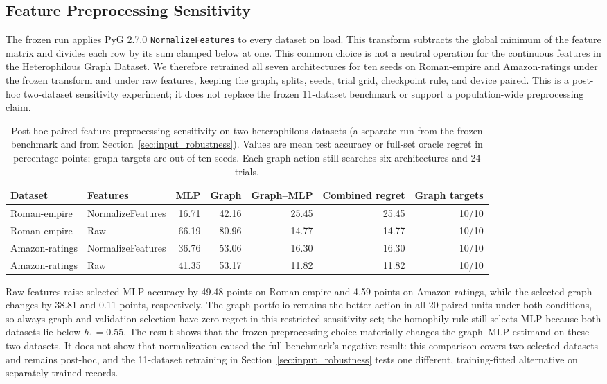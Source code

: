 \subsection{Feature Preprocessing Sensitivity}
\label{sec:preprocessing_sensitivity}

The frozen run applies PyG 2.7.0 \texttt{NormalizeFeatures} to every dataset on load. This transform subtracts the global minimum of the feature matrix and divides each row by its sum clamped below at one. This common choice is not a neutral operation for the continuous features in the Heterophilous Graph Dataset. We therefore retrained all seven architectures for ten seeds on Roman-empire and Amazon-ratings under the frozen transform and under raw features, keeping the graph, splits, seeds, trial grid, checkpoint rule, and device paired. This is a post-hoc two-dataset sensitivity experiment; it does not replace the frozen 11-dataset benchmark or support a population-wide preprocessing claim.

\begin{table}[t]
\centering
\caption{Post-hoc paired feature-preprocessing sensitivity on two heterophilous datasets (a separate run from the frozen benchmark and from Section~\ref{sec:input_robustness}). Values are mean test accuracy or full-set oracle regret in percentage points; graph targets are out of ten seeds. Each graph action still searches six architectures and 24 trials.}
\label{tab:preprocessing_sensitivity}
\small
\begin{tabular}{@{}llrrrrr@{}}
\toprule
Dataset & Features & MLP & Graph & Graph--MLP & Combined regret & Graph targets \\
\midrule
Roman-empire & NormalizeFeatures & 16.71 & 42.16 & 25.45 & 25.45 & 10/10 \\
Roman-empire & Raw & 66.19 & 80.96 & 14.77 & 14.77 & 10/10 \\
Amazon-ratings & NormalizeFeatures & 36.76 & 53.06 & 16.30 & 16.30 & 10/10 \\
Amazon-ratings & Raw & 41.35 & 53.17 & 11.82 & 11.82 & 10/10 \\
\bottomrule
\end{tabular}
\end{table}

Raw features raise selected MLP accuracy by 49.48 points on Roman-empire and 4.59 points on Amazon-ratings, while the selected graph changes by 38.81 and 0.11 points, respectively. The graph portfolio remains the better action in all 20 paired units under both conditions, so always-graph and validation selection have zero regret in this restricted sensitivity set; the homophily rule still selects MLP because both datasets lie below $h_1=0.55$. The result shows that the frozen preprocessing choice materially changes the graph--MLP estimand on these two datasets. It does not show that normalization caused the full benchmark's negative result: this comparison covers two selected datasets and remains post-hoc, and the 11-dataset retraining in Section~\ref{sec:input_robustness} tests one different, training-fitted alternative on separately trained records.

